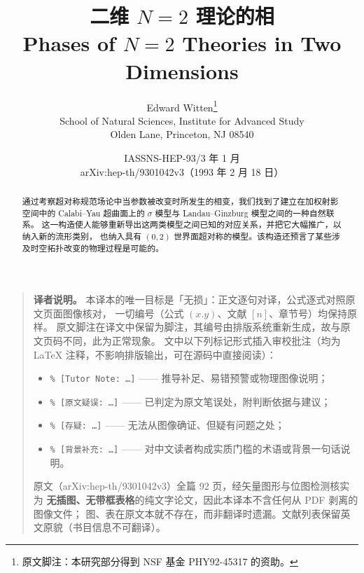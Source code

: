 \documentclass[11pt,a4paper]{article}
\newenvironment{translatornote}
  {\begin{quote}\small\noindent\ignorespaces}
  {\end{quote}\medskip}
\begin{document}
\title{\bfseries 二维 $N=2$ 理论的相\\[0.6em]
       \large Phases of $N=2$ Theories in Two Dimensions}
\author{Edward Witten\thanks{原文脚注：本研究部分得到 NSF 基金 PHY92-45317 的资助。}\\[0.3em]
        \small School of Natural Sciences, Institute for Advanced Study\\
        \small Olden Lane, Princeton, NJ 08540}
\date{\small IASSNS-HEP-93/3 年 1 月\\[0.2em]
      \small arXiv:hep-th/9301042v3（1993 年 2 月 18 日）}
\maketitle

\begin{abstract}
\noindent
通过考察超对称规范场论中当参数被改变时所发生的相变，我们找到了建立在加权射影空间中的
Calabi--Yau 超曲面上的 $\sigma$ 模型与 Landau--Ginzburg 模型之间的一种自然联系。
这一构造使人能够重新导出这两类模型之间已知的对应关系，并把它大幅推广，以纳入新的流形类别，
也纳入具有 $(0,2)$ 世界面超对称的模型。该构造还预言了某些涉及时空拓扑改变的物理过程是可能的。
\end{abstract}

\begin{translatornote}
\textbf{译者说明。}
本译本的唯一目标是「无损」：正文逐句对译，公式逐式对照原文页面图像核对，
一切编号（公式 $(x.y)$、文献 $[n]$、章节号）均保持原样。
原文脚注在译文中保留为脚注，其编号由排版系统重新生成，故与原文页码不同，此为正常现象。
文中以下列标记形式插入审校批注（均为 \LaTeX{} 注释，不影响排版输出，可在源码中直接阅读）：

\begin{itemize}[leftmargin=2em,itemsep=1pt,topsep=2pt]
\item \texttt{\% [Tutor Note: \dots]} —— 推导补足、易错预警或物理图像说明；
\item \texttt{\% [原文疑误: \dots]} —— 已判定为原文笔误处，附判断依据与建议；
\item \texttt{\% [存疑: \dots]} —— 无法从图像确证、但疑有问题之处；
\item \texttt{\% [背景补充: \dots]} —— 对中文读者构成实质门槛的术语或背景一句话说明。
\end{itemize}

原文（arXiv:hep-th/9301042v3）全篇 92 页，经矢量图形与位图检测核实为
\textbf{无插图、无带框表格}的纯文字论文，因此本译本不含任何从 PDF 剥离的图像文件；
图、表在原文本就不存在，而非翻译时遗漏。文献列表保留英文原貌（书目信息不可翻译）。
\end{translatornote}
\end{document}
